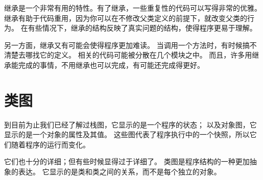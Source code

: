 
继承是一个非常有用的特性。有了继承，一些重复性的代码可以写得非常的优雅。
继承有助于代码重用，因为你可以在不修改父类定义的前提下，就改变父类的行为。
在有些情况下，继承的结构反映了真实问题的结构，使得程序更易于理解。


另一方面，继承又有可能会使得程序更加难读。
当调用一个方法时，有时候搞不清楚去哪找它的定义。
相关的代码可能被分散在几个模块之中。
而且，许多用继承能完成的事情，不用继承也可以完成，有可能还完成得更好。

\section{类图}
\label{class.diagram}


到目前为止我们已经了解过栈图，它显示的是一个程序的状态；
以及对象图，它显示的是一个对象的属性及其值。
这些图代表了程序执行中的一个快照，所以它们随着程序的运行而变化。


它们也十分的详细；但有些时候显得过于详细了。
类图是程序结构的一种更加抽象的表达。
它显示的是类和类之间的关系，而不是每个独立的对象。

